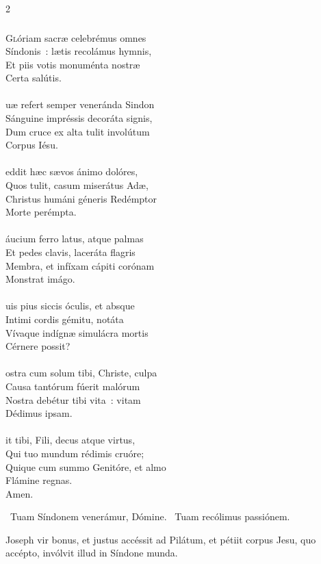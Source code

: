 \documentclass[9pt,twoside]{extarticle}
\begin{document}
\begin{multicols}{2}
\subsubsection*{\center {}}
\lettrine{G}lóriam sacræ celebrémus omnes\\
Síndonis~: lætis recolámus hymnis,\\
Et piis votis monuménta nostræ\\
Certa salútis.\\
\\
uæ refert semper veneránda Sindon\\
Sánguine impréssis decoráta signis,\\
Dum cruce ex alta tulit involútum\\
Corpus Iésu.\\
\\
eddit hæc sævos ánimo dolóres,\\
Quos tulit, casum miserátus Adæ,\\
Christus humáni géneris Redémptor\\
Morte perémpta.\\
\\
áucium ferro latus, atque palmas\\
Et pedes clavis, laceráta flagris\\
Membra, et infíxam cápiti corónam\\
Monstrat imágo.\\
\\
uis pius siccis óculis, et absque\\
Intimi cordis gémitu, notáta\\
Vívaque indígnæ simulácra mortis\\
Cérnere possit?\\
\\
ostra cum solum tibi, Christe, culpa\\
Causa tantórum fúerit malórum\\
Nostra debétur tibi vita~: vitam\\
Dédimus ipsam.\\
\\
it tibi, Fili, decus atque virtus,\\
Qui tuo mundum rédimis cruóre;\\
Quique cum summo Genitóre, et almo\\
Flámine regnas.\\
Amen.

\begin{tightlist}{}
\item {}~Tuam Síndonem venerámur, Dómine. ~Tuam recólimus passiónem.
\item {} Joseph vir bonus, et justus accéssit ad Pilátum, et pétiit corpus Jesu, quo accépto, invólvit illud in Síndone munda.
\end{tightlist}


\end{multicols}
\end{document}
